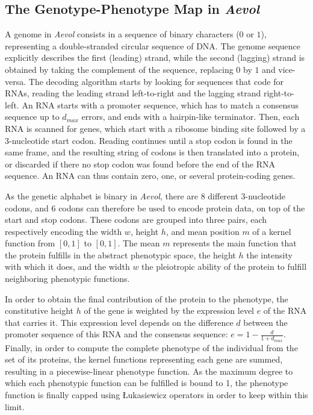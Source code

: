 \subsection{The Genotype-Phenotype Map in \emph{Aevol}}

A genome in \emph{Aevol} consists in a sequence of binary characters ($0$ or $1$), representing a double-stranded circular sequence of DNA.
The genome sequence explicitly describes the first (leading) strand, while the second (lagging) strand is obtained by taking the complement of the sequence, replacing $0$ by $1$ and vice-versa.
The decoding algorithm starts by looking for sequences that code for RNAs, reading the leading strand left-to-right and the lagging strand right-to-left.
An RNA starts with a promoter sequence, which has to match a consensus sequence up to $d_{max}$ errors, and ends with a hairpin-like terminator.
Then, each RNA is scanned for genes, which start with a ribosome binding site followed by a 3-nucleotide start codon.
Reading continues until a stop codon is found in the same frame, and the resulting string of codons is then translated into a protein, or discarded if there no stop codon was found before the end of the RNA sequence.
An RNA can thus contain zero, one, or several protein-coding genes.

As the genetic alphabet is binary in \emph{Aevol}, there are 8 different 3-nucleotide codons, and 6 codons can therefore be used to encode protein data, on top of the start and stop codons.
These codons are grouped into three pairs, each respectively encoding the width $w$, height $h$, and mean position $m$ of a kernel function from $[0, 1]$ to $[0, 1]$.
The mean $m$ represents the main function that the protein fulfills in the abstract phenotypic space, the height $h$ the intensity with which it does, and the width $w$ the pleiotropic ability of the protein to fulfill neighboring phenotypic functions.

In order to obtain the final contribution of the protein to the phenotype, the constitutive height $h$ of the gene is weighted by the expression level $e$ of the RNA that carries it.
This expression level depends on the difference $d$ between the promoter sequence of this RNA and the consensus sequence: $e = 1 - \frac{d}{1+d_{max}}$.
Finally, in order to compute the complete phenotype of the individual from the set of its proteins, the kernel functions representing each gene are summed, resulting in a piecewise-linear phenotype function.
As the maximum degree to which each phenotypic function can be fulfilled is bound to 1, the phenotype function is finally capped using Łukasiewicz operators in order to keep within this limit.

